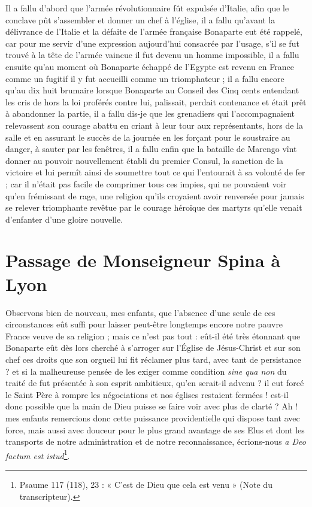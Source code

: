 \documentclass[11pt,a4paper]{report}
\begin{document}
Il a fallu d'abord que l'armée révolutionnaire fût expulsée d'Italie, afin que le conclave pût s'assembler et donner un chef à l'église, il a fallu qu'avant la délivrance de l'Italie et la défaite de l'armée française Bonaparte eut été rappelé, car pour me servir d'une expression aujourd'hui consacrée par l'usage, s'il se fut trouvé à la tête de l'armée vaincue il fut devenu un homme impossible, il a fallu ensuite qu'au moment où Bonaparte échappé de l'Egypte est revenu en France comme un fugitif il y fut accueilli comme un triomphateur ; il a fallu encore qu'au dix huit brumaire lorsque Bonaparte au Conseil des Cinq cents entendant les cris de hors la loi proférés contre lui, palissait, perdait contenance et était prêt à abandonner la partie, il a fallu dis-je que les grenadiers qui l'accompagnaient relevassent son courage abattu en criant à leur tour aux représentants, hors de la salle et en assurant le succès de la journée en les forçant pour le soustraire au danger, à sauter par les fenêtres, il a fallu enfin que la bataille de Marengo vînt donner au pouvoir nouvellement établi du premier Consul, la sanction de la victoire et lui permît ainsi de soumettre tout ce qui l'entourait à sa volonté de fer ; car il n'était pas facile de comprimer tous ces impies, qui ne pouvaient voir qu'en frémissant de rage, une religion qu'ils croyaient avoir renversée pour jamais se relever triomphante revêtue par le courage héroïque des martyrs qu'elle venait d'enfanter d'une gloire nouvelle.

\section*{Passage de Monseigneur Spina à Lyon}

Observons bien de nouveau, mes enfants, que l'absence d'une seule de ces circonstances eût suffi pour laisser peut-être longtemps encore notre pauvre France veuve de sa religion ; mais ce n'est pas tout : eût-il été très étonnant que Bonaparte eût dès lors cherché à s'arroger sur l'Église de Jésus-Christ et sur son chef ces droits que son orgueil lui fit réclamer plus tard, avec tant de persistance ? et si la malheureuse pensée de les exiger comme condition \textit{sine qua non} du traité de fut présentée à son esprit ambitieux, qu'en serait-il advenu ? il eut forcé le Saint Père à rompre les négociations et nos églises restaient fermées ! est-il donc possible que la main de Dieu puisse se faire voir avec plus de clarté ? Ah ! mes enfants remercions donc cette puissance providentielle qui dispose tant avec force, mais aussi avec douceur pour le plus grand avantage de ses Elus et dont les transports de notre administration et de notre reconnaissance, écrions-nous \textit{a Deo factum est istud}\footnote{Psaume 117 (118), 23 : « C'est de Dieu que cela est venu » (Note du transcripteur).}.
\end{document}
